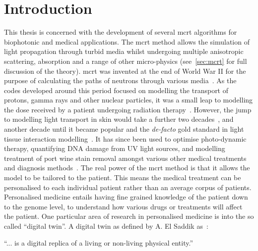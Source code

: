 \chapter{Introduction}


%
%
%
This thesis is concerned with the development of several \gls*{mcrt} algorithms for biophotonic and medical applications.
The \gls*{mcrt} method allows the simulation of light propagation through turbid media whilst undergoing multiple anisotropic scattering, absorption and a range of other micro-physics (see~\cref{sec:mcrt} for full discussion of the theory).
\Gls*{mcrt} was invented at the end of World War II for the purpose of calculating the paths of neutrons through various media~\cite{montybeg1,eckhardt1987stan,anderson1986metropolis,ulam1947statistical}.
As the codes developed around this period focused on modelling the transport of protons, gamma rays and other nuclear particles, it was a small leap to modelling the dose received by a patient undergoing radiation therapy~\cite{ellett1964gamma}.
However, the jump to modelling light transport in skin would take a further two decades~\cite{wilson1983monte}, and another decade until it became popular and the \textit{de-facto} gold standard in light tissue interaction modelling~\cite{wang1995mcml,key1991monte}.
It has since been used to optimise photo-dynamic therapy, quantifying DNA damage from UV light sources, and modelling treatment of port wine stain removal amongst various other medical treatments and diagnosis methods~\cite{barnard2018quantifying,smithies1995modelling,campbell2015monte}.
The real power of the \gls*{mcrt} method is that it allows the model to be tailored to the patient.
This means the medical treatment can be personalised to each individual patient rather than an average corpus of patients.\\


Personalised medicine entails having fine grained knowledge of the patient down to the genome level, to understand how various drugs or treatments will affect the patient.
One particular area of research in personalised medicine is into the so called ``digital twin''.
A digital twin as defined by A. El Saddik as~\cite{el2018digital}:

\medskip
``... is a digital replica of a living or non-living physical entity.''
\medskip

